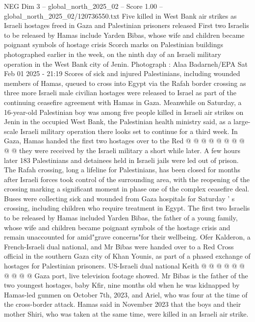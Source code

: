 \begin{textsample}{NEG Dim 3 – global\_north\_2025\_02 – Score 1.00 – global\_north\_2025\_02/120736550.txt}  \label{ex:f3_neg_179}
Five killed in West Bank air strikes as Israeli hostages freed in Gaza and Palestinian prisoners released First two Israelis to be released by Hamas include Yarden Bibas, whose wife and children became poignant symbols of hostage crisis Scorch marks on Palestinian buildings photographed earlier in the week, on the ninth day of an Israeli military operation in the West Bank city of Jenin.
Photograph : Alaa Badarneh/EPA Sat Feb 01 2025 - 21:19 Scores of sick and injured Palestinians, including wounded members of Hamas, queued to cross into Egypt via the Rafah border crossing as three more Israeli male civilian hostages were released to Israel as part of the continuing ceasefire agreement with Hamas in Gaza.
Meanwhile on Saturday, a 16-year-old Palestinian boy was among five people killed in Israeli air strikes on Jenin in the occupied West Bank, the Palestinian health ministry said, as a large-scale Israeli military operation there looks set to continue for a third week.
In Gaza, Hamas handed the first two hostages over to the Red @ @ @ @ @ @ @ @ @ @ they were received by the Israeli military a short while later.
A few hours later 183 Palestinians and detainees held in Israeli jails were led out of prison.
The Rafah crossing, long a lifeline for Palestinians, has been closed for months after Israeli forces took control of the surrounding area, with the reopening of the crossing marking a significant moment in phase one of the complex ceasefire deal.
Buses were collecting sick and wounded from Gaza hospitals for Saturday ' s crossing, including children who require treatment in Egypt.
The first two Israelis to be released by Hamas included Yarden Bibas, the father of a young family, whose wife and children became poignant symbols of the hostage crisis and remain unaccounted for amid"grave concerns"for their wellbeing.
Ofer Kalderon, a French-Israeli dual national, and Mr Bibas were handed over to a Red Cross official in the southern Gaza city of Khan Younis, as part of a phased exchange of hostages for Palestinian prisoners.
US-Israeli dual national Keith @ @ @ @ @ @ @ @ @ @ Gaza port, live television footage showed.
Mr Bibas is the father of the two youngest hostages, baby Kfir, nine months old when he was kidnapped by Hamas-led gunmen on October 7th, 2023, and Ariel, who was four at the time of the cross-border attack.
Hamas said in November 2023 that the boys and their mother Shiri, who was taken at the same time, were killed in an Israeli air strike.

\end{textsample}

